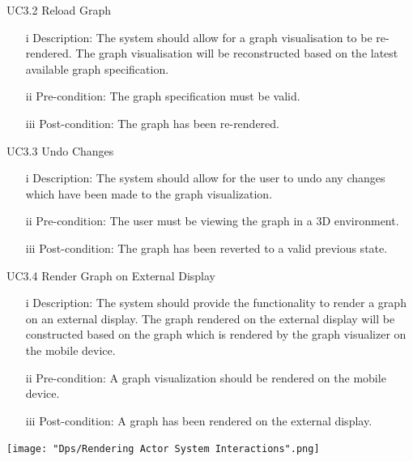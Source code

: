 \documentclass[12pt]{article}
\begin{document}
\bigskip

\begin{flushleft}
UC3.2 Reload Graph
\begin{itemize}
\item[i] Description: The system should allow for a graph visualisation to be re-rendered. The graph visualisation will be reconstructed based on the latest available graph specification.
\item[ii] Pre-condition: The graph specification must be valid.
\item[iii] Post-condition: The graph has been re-rendered.
\end{itemize}
\end{flushleft}

\bigskip

\begin{flushleft}
UC3.3 Undo Changes
\begin{itemize}
\item[i] Description: The system should allow for the user to undo any changes which have been made to the graph visualization.
\item[ii] Pre-condition: The user must be viewing the graph in a 3D environment.
\item[iii] Post-condition: The graph has been reverted to a valid previous state.
\end{itemize}
\end{flushleft}

\bigskip

\begin{flushleft}
UC3.4 Render Graph on External Display
\begin{itemize}
\item[i]Description: The system should provide the functionality to render a graph on an external display. The graph rendered on the external display will be constructed based on the graph which is rendered by the graph visualizer on the mobile device.
\item[ii] Pre-condition: A graph visualization should be rendered on the mobile device.
\item[iii] Post-condition: A graph has been rendered on the external display.
\end{itemize}
\end{flushleft}

\texttt{[image: "Dps/Rendering Actor System Interactions".png]}
\end{document}
